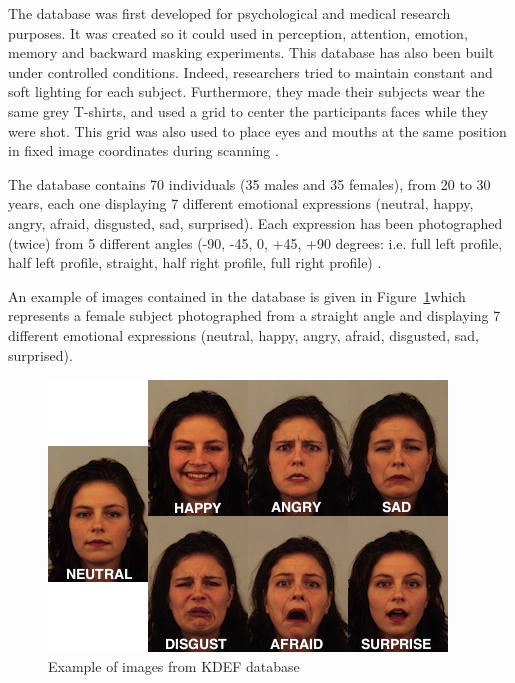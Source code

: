 \noindent The database was first developed for psychological and medical research purposes. It was created so it could used in perception, attention, emotion, memory and backward masking experiments. This database has also been built under controlled conditions. Indeed, researchers tried to maintain constant and soft lighting for each subject. Furthermore, they made their subjects wear the same grey T-shirts, and used a grid to center the participants faces while they were shot. This grid was also used to place eyes and mouths at the same position in fixed image coordinates during scanning \cite{KDEF}.
\newline

\noindent The database contains 70 individuals (35 males and 35 females), from 20 to 30 years, each one displaying 7 different emotional expressions (neutral, happy, angry, afraid, disgusted, sad, surprised). Each expression has been photographed (twice) from 5 different angles (-90, -45, 0, +45, +90 degrees: i.e. full left profile, half left profile, straight, half right profile, full right profile)  \cite{KDEF}.
\newline

\noindent An example of images contained in the database is given in Figure~\ref{kdef_7facialexpressions}which represents a female subject photographed from a straight angle and displaying 7 different emotional expressions (neutral, happy, angry, afraid, disgusted, sad, surprised).
\newline

\begin{figure}[!h]
\begin{center}
\noindent \includegraphics[scale=0.65]{figures/kdef_7facialexpressions} 
\newline
\caption{Example of images from KDEF database}
\label{kdef_7facialexpressions}
\end{center} 
\end{figure}


